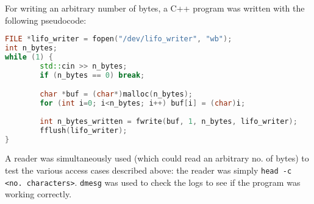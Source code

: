 \documentclass[12pt]{article}
\begin{document}
For writing an arbitrary number of bytes, a C++ program was written with the following 
pseudocode:

\begin{lstlisting}[language=C++]
FILE *lifo_writer = fopen("/dev/lifo_writer", "wb");
int n_bytes;
while (1) {
        std::cin >> n_bytes;
        if (n_bytes == 0) break;

        char *buf = (char*)malloc(n_bytes);
        for (int i=0; i<n_bytes; i++) buf[i] = (char)i;
        
        int n_bytes_written = fwrite(buf, 1, n_bytes, lifo_writer);
        fflush(lifo_writer);
}
\end{lstlisting}

A reader was simultaneously used (which could read an arbitrary no. of bytes)
to test the various access cases described above: the reader was simply
\texttt{head -c <no. characters>}. \texttt{dmesg} was used to check the logs to
see if the program was working correctly.
\end{document}
